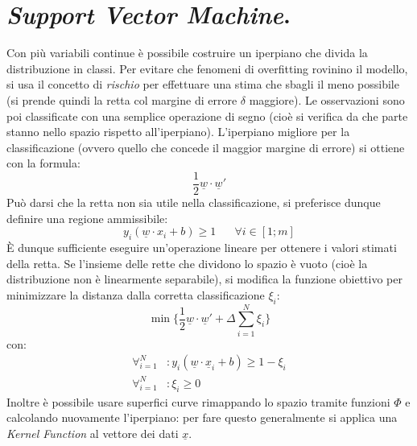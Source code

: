 \documentclass[11pt, a4page, twocolumn]{article}
\begin{document}
\section{\textit{Support Vector Machine}.}
Con più variabili continue è possibile costruire un iperpiano che divida la distribuzione in classi.
Per evitare che fenomeni di overfitting rovinino il modello, si usa il concetto di \textit{rischio} per effettuare una stima che sbagli il meno possibile (si prende quindi la retta col margine di errore $\delta$ maggiore).
Le osservazioni sono poi classificate con una semplice operazione di segno (cioè si verifica da che parte stanno nello spazio rispetto all'iperpiano).
L'iperpiano migliore per la classificazione (ovvero quello che concede il maggior margine di errore) si ottiene con la formula:
\begin{equation*}
 \frac{1}{2} \underline{w} \cdot \underline{w}'
\end{equation*}
Può darsi che la retta non sia utile nella classificazione, si preferisce dunque definire una regione ammissibile:
\begin{equation*}
  y_i (\underline{w} \cdot x_i + b) \ge 1 \hspace{20pt} \forall i \in [1; m]
\end{equation*}
È dunque sufficiente eseguire un'operazione lineare per ottenere i valori stimati della retta.
Se l'insieme delle rette che dividono lo spazio è vuoto (cioè la distribuzione non è linearmente separabile), si modifica la funzione obiettivo per minimizzare la distanza dalla corretta classificazione $\xi_i$:
\begin{equation*}
  \min{\{\frac{1}{2} \underline{w} \cdot \underline{w}' + \Delta \sum^N_{i=1}{\xi_i}\}}
\end{equation*}
con:
\begin{align*}
  \forall^N_{i=1} &: y_i(\underline{w} \cdot \underline{x}_i + b) \ge 1 - \xi_i \\
  \forall^N_{i=1} &: \xi_i \ge 0
\end{align*}
Inoltre è possibile usare superfici curve rimappando lo spazio tramite funzioni $\Phi$ e calcolando nuovamente l'iperpiano: per fare questo generalmente si applica una \textit{Kernel Function} al vettore dei dati $\underline{x}$.
\end{document}
